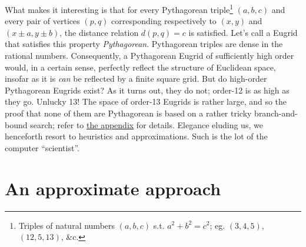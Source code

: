\documentclass[letterpaper]{article}
\begin{document}
What makes it interesting is that for every Pythagorean triple\footnote{Triples of natural
numbers $(a, b, c)$ s.t. $a^2 + b^2 = c^2$; eg. $(3, 4, 5)$, $(12, 5, 13)$, \&c.}  $(a, b,
c)$ and every pair of vertices $(p, q)$ corresponding respectively to $(x, y)$ and $(x \pm a,
y \pm b)$, the distance relation $d(p, q) = c$ is satisfied. Let's call a Eugrid that
satisfies this property \emph{Pythagorean}. Pythagorean triples are dense in the rational
numbers. Consequently, a Pythagorean Eugrid of sufficiently high order would, in a certain
sense, perfectly reflect the structure of Euclidean space, insofar as it is \emph{can} be
reflected by a finite square grid. But do high-order Pythagorean Eugrids exist? As it turns
out, they do not; order-12 is as high as they go. Unlucky 13! The space of order-13 Eugrids
is rather large, and so the proof that none of them are Pythagorean is based on a rather
tricky branch-and-bound search; refer to \hyperref[sec:appendix]{the appendix} for details.
Elegance eluding us, we henceforth resort to heuristics and approximations. Such is the lot
of the computer ``scientist''.

\section{An approximate approach}
\end{document}
